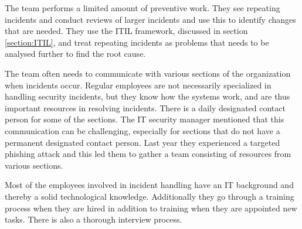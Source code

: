 \documentclass[b5paper, twoside, openright, 11pt]{report}
\begin{document}

The team performs a limited amount of preventive work. They see repeating incidents and conduct reviews of larger incidents and use this to identify changes that are needed. They use the \ac{ITIL} framework, discussed in section \ref{section:ITIL}, and treat repeating incidents as problems that needs to be analysed further to find the root cause.

The team often needs to communicate with various sections of the organization when incidents occur. Regular employees are not necessarily specialized in handling security incidents, but they know how the systems work, and are thus important resources in resolving incidents. There is a daily designated contact person for some of the sections. The IT security manager mentioned that this communication can be challenging, especially for sections that do not have a permanent designated contact person. Last year they experienced a targeted phishing attack and this led them to gather a team consisting of resources from various sections.

Most of the employees involved in incident handling have an IT background and thereby a solid technological knowledge. Additionally they go through a training process when they are hired in addition to training when they are appointed new tasks. There is also a thorough interview process.
\end{document}
